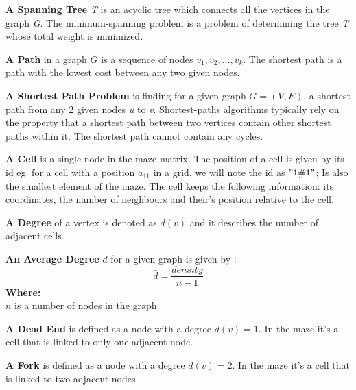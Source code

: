 \begin{definition}\textbf{A Spanning Tree }\textit{T} is an acyclic tree which connects all the vertices in the graph \textit{G}. The minimum-spanning problem is a problem of determining the tree \textit{T} whose total weight is minimized.\end{definition}
\begin{definition}\textbf{A Path }in a graph $G$ is a sequence of nodes $v_1, v_2,\ldots,v_k$. The shortest path is a path with the lowest cost between any two given nodes.\end{definition}
\begin{definition}\textbf{A Shortest Path Problem }is finding for a given graph $G = (V,E)$, a shortest path from any 2 given nodes \textit{u} to \textit{v}. Shortest-paths algorithms typically rely on the property that a shortest path between two vertices contain other shortest paths within it.
The shortest path cannot contain any cycles.\cite{RTrud}\end{definition}
\begin{definition}\textbf{A Cell} is a single node in the maze matrix. The position of a cell is given by its id eg. for a cell with a position $a_{11}$ in a grid, we will note the id as $"1\char"0023 1"$; Is also the smallest element of the maze. The cell keeps the following information: its coordinates, the number of neighbours and their’s position relative to the cell.	\end{definition}
\begin{definition}\textbf{A Degree }of a vertex is denoted as $d(v)$ and it describes the number of adjacent cells.\cite{ReHofs}\end{definition}
\begin{definition}\textbf{An Average Degree } $\bar{d}$ for a given graph is given by \cite{ReHofs}:\\
\begin{equation}
\bar{d} = \frac{density}{n-1}	
\end{equation}
\textbf{Where:}\\
$n$ is a number of nodes in the graph\\	
\end{definition}
\begin{definition}\textbf{A Dead End} is defined as a node with a degree $d(v) = 1$. In the maze it's a cell that is linked to only one adjacent node.\end{definition}
\begin{definition}\textbf{A Fork} is defined as a node with a degree $d(v) = 2$. In the maze it's a cell that is linked to two adjacent nodes.\end{definition}
